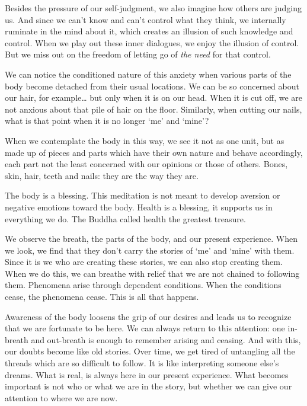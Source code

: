 Besides the pressure of our self-judgment, we also imagine how others
are judging us. And since we can't know and can't control what they
think, we internally ruminate in the mind about it, which creates an
illusion of such knowledge and control. When we play out these inner
dialogues, we enjoy the illusion of control. But we miss out on the
freedom of letting go of \emph{the need} for that control.


We can notice the conditioned nature of this anxiety when various parts
of the body become detached from their usual locations. We can be so
concerned about our hair, for example\ldots{} but only when it is on our
head. When it is cut off, we are not anxious about that pile of hair on
the floor. Similarly, when cutting our nails, what is that point when it
is no longer `me' and `mine'?

When we contemplate the body in this way, we see it not as one unit, but
as made up of pieces and parts which have their own nature and behave
accordingly, each part not the least concerned with our opinions or
those of others. Bones, skin, hair, teeth and nails: they are the way
they are.

The body is a blessing. This meditation is not meant to develop aversion
or negative emotions toward the body. Health is a blessing, it supports
us in everything we do. The Buddha called health the greatest treasure.


We observe the breath, the parts of the body, and our present
experience. When we look, we find that they don't carry the stories of
`me' and `mine' with them. Since it is we who are creating these
stories, we can also stop creating them. When we do this, we can breathe
with relief that we are not chained to following them. Phenomena arise
through dependent conditions. When the conditions cease, the phenomena
cease. This is all that happens.

Awareness of the body loosens the grip of our desires and leads us to
recognize that we are fortunate to be here. We can always return to this
attention: one in-breath and out-breath is enough to remember arising
and ceasing. And with this, our doubts become like old stories. Over
time, we get tired of untangling all the threads which are so difficult
to follow. It is like interpreting someone else's dreams. What is real,
is always here in our present experience. What becomes important is not
who or what we are in the story, but whether we can give our attention
to where we are now.

